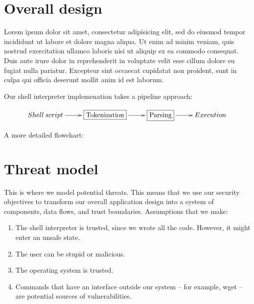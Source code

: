 \documentclass[12pt]{article}
\begin{document}
\section{Overall design}
Lorem ipsum dolor sit amet, consectetur adipisicing elit, sed do eiusmod tempor incididunt ut labore et dolore magna aliqua. Ut enim ad minim veniam, quis nostrud exercitation ullamco laboris nisi ut aliquip ex ea commodo consequat. Duis aute irure dolor in reprehenderit in voluptate velit esse cillum dolore eu fugiat nulla pariatur. Excepteur sint occaecat cupidatat non proident, sunt in culpa qui officia deserunt mollit anim id est laborum.

Our shell interpreter implemenation takes a pipeline approach:

\begin{displaymath}
\xymatrix{
Shell \: script \ar[r] & \framebox{Tokenization} \ar[r] & \framebox{Parsing} \ar[r] & Execution
}
\end{displaymath}

A more detailed flowchart:


\section{Threat model}
This is where we model potential threats. This means that we use our security objectives to transform our overall application design into a system of components, data flows, and trust boundaries. Assumptions that we make:

\begin{enumerate}
  \item The shell interpreter is trusted, since we wrote all the code. However, it might enter an unsafe state.
  \item The user can be stupid or malicious.
  \item The operating system is trusted.
  \item Commands that have an interface outside our system -- for example, wget -- are potential sources of vulnerabilities.
\end{enumerate}
\end{document}
